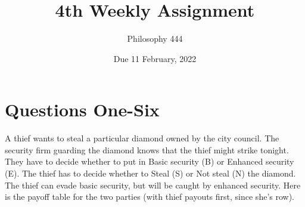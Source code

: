 \documentclass[
  11pt,
]{article}
\title{4th Weekly Assignment}
\author{Philosophy 444}
\date{Due 11 February, 2022}
\begin{document}
\maketitle

\hypertarget{questions-one-six}{%
\section{Questions One-Six}\label{questions-one-six}}

A thief wants to steal a particular diamond owned by the city council.
The security firm guarding the diamond knows that the thief might strike
tonight. They have to decide whether to put in Basic security (B) or
Enhanced security (E). The thief has to decide whether to Steal (S) or
Not steal (N) the diamond. The thief can evade basic security, but will
be caught by enhanced security. Here is the payoff table for the two
parties (with thief payouts first, since she's row).

 
  \providecommand{\huxb}[2]{\arrayrulecolor[RGB]{#1}\global\arrayrulewidth=#2pt}
  \providecommand{\huxvb}[2]{\color[RGB]{#1}\vrule width #2pt}
  \providecommand{\huxtpad}[1]{\rule{0pt}{#1}}
  \providecommand{\huxbpad}[1]{\rule[-#1]{0pt}{#1}}
\end{document}
